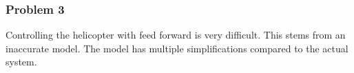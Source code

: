 \subsubsection{Problem 3}
Controlling the helicopter with feed forward is very difficult. 
This stems from an inaccurate model. The model has multiple simplifications compared to the actual system.
